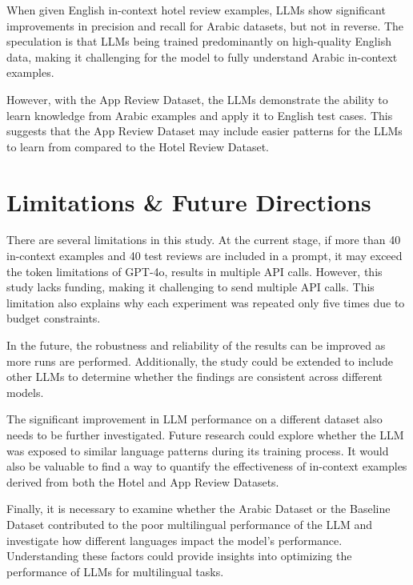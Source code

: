 \documentclass[sigconf, nonacm]{acmart}
\theoremstyle{definition}
\begin{document}
When given English in-context hotel review examples, LLMs show significant improvements in precision and recall for Arabic datasets, but not in reverse. The speculation is that LLMs being trained predominantly on high-quality English data, making it challenging for the model to fully understand Arabic in-context examples.

However, with the App Review Dataset, the LLMs demonstrate the ability to learn knowledge from Arabic examples and apply it to English test cases. This suggests that the App Review Dataset may include easier patterns for the LLMs to learn from compared to the Hotel Review Dataset.

\section{Limitations \& Future Directions}
There are several limitations in this study. At the current stage, if more than 40 in-context examples and 40 test reviews are included in a prompt, it may exceed the token limitations of GPT-4o, results in multiple API calls. However, this study lacks funding, making it challenging to send multiple API calls. This limitation also explains why each experiment was repeated only five times due to budget constraints.

In the future, the robustness and reliability of the results can be improved as more runs are performed. Additionally, the study could be extended to include other LLMs to determine whether the findings are consistent across different models.

The significant improvement in LLM performance on a different dataset also needs to be further investigated. Future research could explore whether the LLM was exposed to similar language patterns during its training process. It would also be valuable to find a way to quantify the effectiveness of in-context examples derived from both the Hotel and App Review Datasets.

Finally, it is necessary to examine whether the Arabic Dataset or the Baseline Dataset contributed to the poor multilingual performance of the LLM and investigate how different languages impact the model's performance. Understanding these factors could provide insights into optimizing the performance of LLMs for multilingual tasks.



\end{document}
